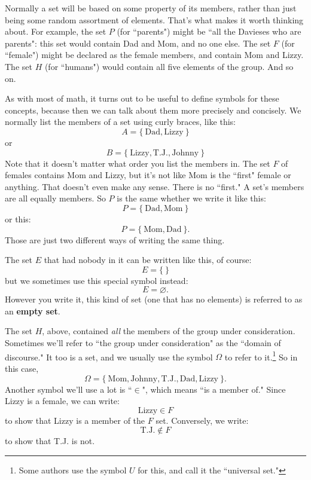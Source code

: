 Normally a set will be based on some property of its members, rather than
just being some random assortment of elements. That's what makes it worth
thinking about.  For example, the set $P$ (for ``parents") might be ``all
the Davieses who are parents": this set would contain Dad and Mom, and
no one else. The set $F$ (for ``female") might be declared as the female
members, and contain Mom and Lizzy. The set $H$ (for ``humans") would
contain all five elements of the group. And so on.

As with most of math, it turns out to be useful to define symbols for these
concepts, because then we can talk about them more precisely and concisely.
We normally list the members of a set using curly braces, like this:
\[
A = \{~\text{Dad}, \text{Lizzy}~\}
\]
or
\[
B = \{~\text{Lizzy}, \text{T.J.}, \text{Johnny}~\}
\]
Note that it doesn't matter what order you list the members in. The set
$F$ of females contains Mom and Lizzy, but it's not like Mom is the
``first" female or anything. That doesn't even make any sense. There is no
``first." A set's members are all equally members. So $P$ is the same
whether we write it like this:
\[
P = \{~\text{Dad}, \text{Mom}~\}
\]
or this:
\[
P = \{~\text{Mom}, \text{Dad}~\}.
\]
Those are just two different ways of writing the same thing.

The set $E$ that had nobody in it can be written like this, of course:
\[
E = \{~\}
\]
but we sometimes use this special symbol instead:
\[
E = \varnothing.
\]
However you write it, this kind of set (one that has no elements) is
referred to as an \textbf{empty set}.

The set $H$, above, contained \textit{all} the members of the group under
consideration. Sometimes we'll refer to ``the group under consideration" as
the ``domain of discourse."  It too is a set, and we usually use the symbol
$\Omega$ to refer to it.\footnote{Some authors use the symbol $U$ for this,
and call it the ``universal set."} So in this case,
\[
\Omega = \{~\text{Mom}, \text{Johnny}, \text{T.J.}, \text{Dad},
\text{Lizzy}~\}.
\]
Another symbol we'll use a lot is ``$\in$", which means ``is a member
of."  Since Lizzy is a female, we can write:
\[
\text{Lizzy} \in F
\]
to show that Lizzy is a member of the $F$ set. Conversely, we write:
\[
\text{T.J.} \notin F
\]
to show that T.J. is not. 

